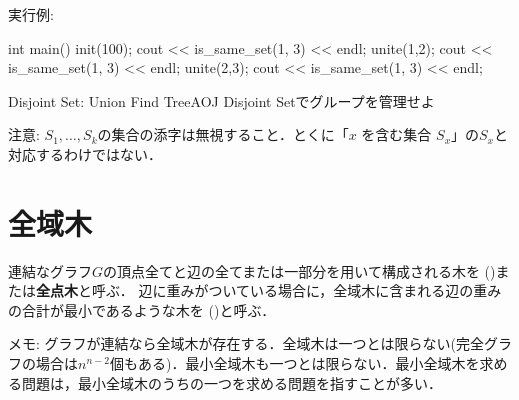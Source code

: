 実行例:

\begin{cbox}
int main() {
  init(100);
  cout << is_same_set(1, 3) << endl;
  unite(1,2);
  cout << is_same_set(1, 3) << endl;
  unite(2,3);
  cout << is_same_set(1, 3) << endl;
}\end{cbox}

\begin{psbox}{Disjoint Set: Union Find Tree}{AOJ}
Disjoint Setでグループを管理せよ

注意: $S_1,\ldots,S_k$の集合の添字は無視すること．とくに「$x$ を含む集合 $S_x $」の$S_x$と対応するわけではない．

\end{psbox}

\section{全域木}

連結なグラフ$G$の頂点全てと辺の全てまたは一部分を用いて構成される木を
 ()または\textbf{全点木}と呼ぶ．
辺に重みがついている場合に，全域木に含まれる辺の重みの合計が最小であるような木を
 ()と呼ぶ．

メモ: グラフが連結なら全域木が存在する．全域木は一つとは限らない(完全グラフの場合は$n^{n-2}$個もある)．最小全域木も一つとは限らない．最小全域木を求める問題は，最小全域木のうちの一つを求める問題を指すことが多い．


